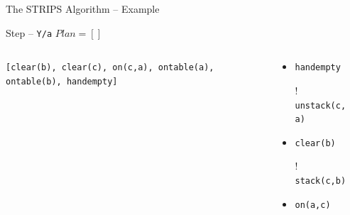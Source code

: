 \documentclass[presentation]{beamer}\mode<presentation>{\usetheme{AMSBolognaFC}}
\begin{document}
\begin{frame}[c]{The STRIPS Algorithm -- Example}
\small

	\begin{exampleblock}{Step \nextStripsExampleStep{} -- \texttt{Y/a} \hfill $Plan = []$}
		\begin{columns}[t]
			\begin{column}{.30\linewidth}\centering
				\texttt{[clear(b), clear(c), on(c,a), ontable(a), ontable(b), \alert{handempty}]}
			\end{column}
			\begin{column}{.50\linewidth}\centering
				\begin{itemize}
					\item \alert{\texttt{handempty}}
					\item[!] \texttt{unstack(c, a)}
					\item \texttt{clear(b)}
					\item[!] \texttt{stack(c,b)}
					\item \texttt{on(a,c)}
				\end{itemize}
			\end{column}
			\begin{column}{.10\linewidth}\centering
				
			\end{column}
		\end{columns}
	\end{exampleblock}

\end{frame}
\end{document}

